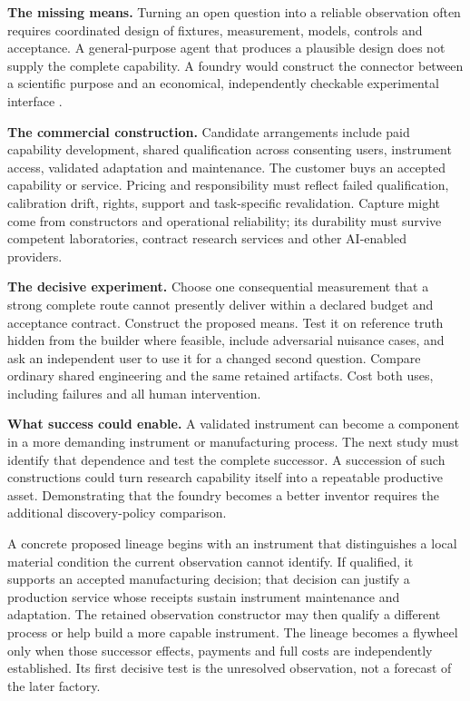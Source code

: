 \documentclass[11pt,letterpaper]{article}
\begin{document}
\textbf{The missing means.} Turning an open question into a reliable observation often requires coordinated design of fixtures, measurement, models, controls and acceptance. A general-purpose agent that produces a plausible design does not supply the complete capability. A foundry would construct the connector between a scientific purpose and an economical, independently checkable experimental interface \cite{world,outlearn,flywheel11}.

\textbf{The commercial construction.} Candidate arrangements include paid capability development, shared qualification across consenting users, instrument access, validated adaptation and maintenance. The customer buys an accepted capability or service. Pricing and responsibility must reflect failed qualification, calibration drift, rights, support and task-specific revalidation. Capture might come from constructors and operational reliability; its durability must survive competent laboratories, contract research services and other AI-enabled providers.

\textbf{The decisive experiment.} Choose one consequential measurement that a strong complete route cannot presently deliver within a declared budget and acceptance contract. Construct the proposed means. Test it on reference truth hidden from the builder where feasible, include adversarial nuisance cases, and ask an independent user to use it for a changed second question. Compare ordinary shared engineering and the same retained artifacts. Cost both uses, including failures and all human intervention.

\textbf{What success could enable.} A validated instrument can become a component in a more demanding instrument or manufacturing process. The next study must identify that dependence and test the complete successor. A succession of such constructions could turn research capability itself into a repeatable productive asset. Demonstrating that the foundry becomes a better inventor requires the additional discovery-policy comparison.

A concrete proposed lineage begins with an instrument that distinguishes a local material condition the current observation cannot identify. If qualified, it supports an accepted manufacturing decision; that decision can justify a production service whose receipts sustain instrument maintenance and adaptation. The retained observation constructor may then qualify a different process or help build a more capable instrument. The lineage becomes a flywheel only when those successor effects, payments and full costs are independently established. Its first decisive test is the unresolved observation, not a forecast of the later factory.
\end{document}
